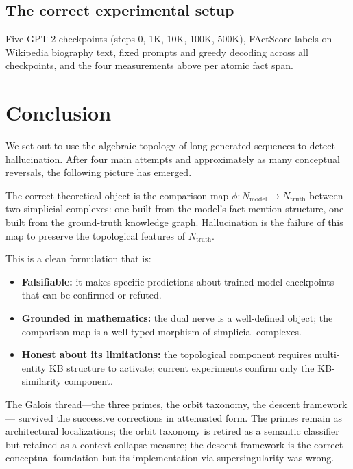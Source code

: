 \documentclass[11pt]{amsart}
\theoremstyle{definition}
\newcommand{\Nmod}{N_{\mathrm{model}}}
\newcommand{\Ntruth}{N_{\mathrm{truth}}}
\begin{document}
\subsection{The correct experimental setup}

Five GPT-2 checkpoints (steps 0, 1K, 10K, 100K, 500K),
FActScore labels on Wikipedia biography text,
fixed prompts and greedy decoding across all checkpoints,
and the four measurements above per atomic fact span.

\section{Conclusion}

We set out to use the algebraic topology of long generated sequences
to detect hallucination.
After four main attempts and approximately as many conceptual reversals,
the following picture has emerged.

The correct theoretical object is the comparison map
$\phi: \Nmod \to \Ntruth$ between two simplicial complexes:
one built from the model's fact-mention structure,
one built from the ground-truth knowledge graph.
Hallucination is the failure of this map to preserve the topological
features of $\Ntruth$.

This is a clean formulation that is:
\begin{itemize}
\item \textbf{Falsifiable:} it makes specific predictions about trained
  model checkpoints that can be confirmed or refuted.
\item \textbf{Grounded in mathematics:} the dual nerve is a well-defined
  object; the comparison map is a well-typed morphism of simplicial complexes.
\item \textbf{Honest about its limitations:} the topological component
  requires multi-entity KB structure to activate; current experiments
  confirm only the KB-similarity component.
\end{itemize}

The Galois thread---the three primes, the orbit taxonomy, the descent framework---
survived the successive corrections in attenuated form.
The primes remain as architectural localizations; the orbit taxonomy is retired
as a semantic classifier but retained as a context-collapse measure;
the descent framework is the correct conceptual foundation but its implementation
via supersingularity was wrong.
\end{document}
